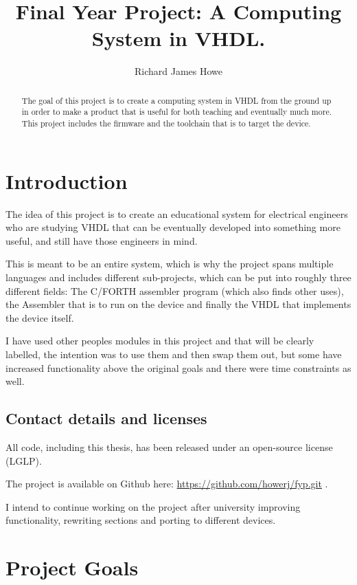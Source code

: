\documentclass	[a4paper, 10pt]	{article}
\title		{Final Year Project: A Computing System in VHDL.}
\author		{Richard James Howe}
\begin{document}
	\maketitle
	\hrulefill

	\begin{abstract}
    The goal of this project is to create a computing system in VHDL from the
    ground up in order to make a product that is useful for both teaching and
    eventually much more. This project includes the firmware and the toolchain
    that is to target the device.
	\end{abstract}

	\tableofcontents
  \listoffigures

  \section{Introduction}

  The idea of this project is to create an educational system for electrical
  engineers who are studying VHDL that can be eventually developed into something 
  more useful, and still have those engineers in mind. 

  This is meant to be an entire system, which is why the project spans multiple
  languages and includes different sub-projects, which can be put into roughly
  three different fields: The C/FORTH assembler program (which also finds other
  uses), the Assembler that is to run on the device and finally the VHDL that implements
  the device itself.

  I have used other peoples modules in this project and that will be clearly labelled,
  the intention was to use them and then swap them out, but some have increased
  functionality above the original goals and there were time constraints as well.

  \subsection{Contact details and licenses}

  All code, including this thesis, has been released under an open-source
  license (LGLP).

  The project is available on Github here: \url{https://github.com/howerj/fyp.git} .

  I intend to continue working on the project after university improving functionality,
  rewriting sections and porting to different devices.

  \section{Project Goals}
\end{document}
